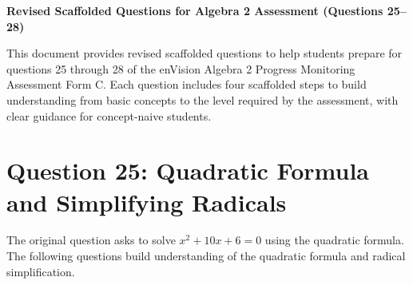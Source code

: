 \documentclass[12pt]{article}
\begin{document}
\begin{center}
    \textbf{Revised Scaffolded Questions for Algebra 2 Assessment (Questions 25--28)}
\end{center}

This document provides revised scaffolded questions to help students prepare for questions 25 through 28 of the enVision Algebra 2 Progress Monitoring Assessment Form C. Each question includes four scaffolded steps to build understanding from basic concepts to the level required by the assessment, with clear guidance for concept-naive students.

\section*{Question 25: Quadratic Formula and Simplifying Radicals}
The original question asks to solve \( x^2 + 10x + 6 = 0 \) using the quadratic formula. The following questions build understanding of the quadratic formula and radical simplification.
\end{document}
